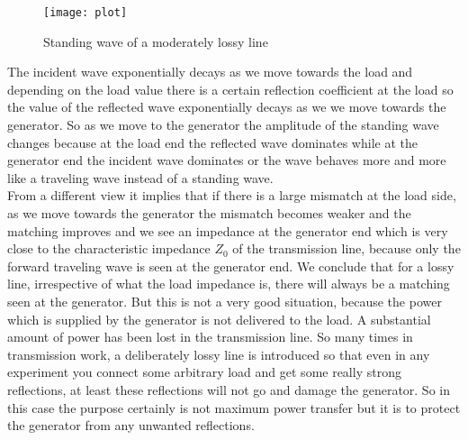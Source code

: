 \begin{figure}[h]
	\centering
	\texttt{[image: plot]}
	\caption{Standing wave of a moderately lossy line}
\end{figure}
The incident wave exponentially decays as we move towards the load and depending on the load value there is a certain reflection coefficient at the load so the value of the reflected wave exponentially decays as we we move towards the generator. So as we move to the generator the amplitude of the standing wave changes because at the load end the reflected wave dominates while at the generator end the incident wave dominates or the wave behaves more and more like a traveling wave instead of a standing wave.\\

From a different view it implies that if there is a large mismatch at the load side, as we move towards the generator the mismatch becomes weaker and the matching improves and we see an impedance at the generator end which is very close to the characteristic impedance $Z_0$ of the transmission line, because only the forward traveling wave is seen at the generator end. We conclude that for a lossy line, irrespective of what the load impedance is, there will always be a matching seen at the generator. But this is not a very good situation, because the power which is supplied by the generator is not delivered to the load. A substantial amount of power has been lost in the transmission line. So many times in transmission work, a deliberately lossy line is introduced so that even in any experiment you connect some arbitrary load and get  some really strong reflections, at least these reflections will not go and damage the generator. So in this case the purpose certainly is not maximum power transfer but it is to protect the generator from any unwanted reflections.


